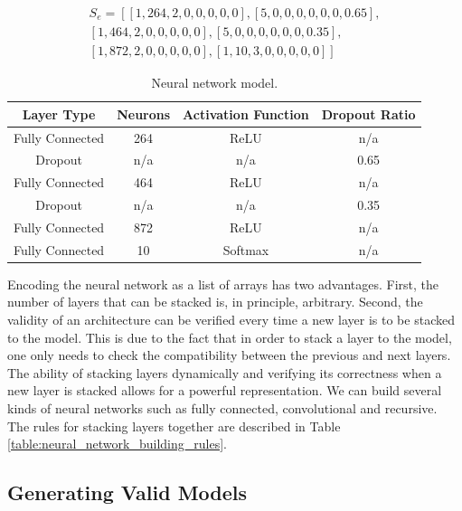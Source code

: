 \documentclass[12pt]{elsart}%
\begin{document}
\begin{align*}
S_e = \left[ \left[1, 264, 2, 0, 0, 0, 0, 0 \right], \left[5, 0, 0, 0, 0, 0, 0, 0.65 \right], \right. \\
\left. \left[1, 464, 2, 0, 0, 0, 0, 0 \right], \left[5, 0, 0, 0, 0, 0, 0, 0.35 \right], \right. \\
\left. \left[1, 872, 2, 0, 0, 0, 0, 0 \right], \left[1, 10, 3, 0, 0, 0, 0, 0 \right] \right]
\end{align*}

\begin{table}[!htb]
\begin{center}
\caption{Neural network model.}
\label{table:neural_network_model}
\vspace{12pt}
\begin{tabular}{| c | c | c | c |}
\hline
Layer Type & Neurons & Activation Function & Dropout Ratio \\
\hline
Fully Connected & 264 & ReLU & n/a \\
Dropout & n/a & n/a & 0.65 \\
Fully Connected & 464 & ReLU & n/a\\
Dropout & n/a & n/a & 0.35\\
Fully Connected & 872 & ReLU & n/a\\
Fully Connected & 10 & Softmax & n/a\\
\hline
\end{tabular}
\end{center}
\end{table}

Encoding the neural network as a list of arrays has two advantages. First, the number of layers that can be stacked is, in principle, arbitrary. Second, the validity of an architecture can be verified every time a new layer is to be stacked to the model. This is due to the fact that in order to stack a layer to the model, one only needs to check the compatibility between the previous and next layers. The ability of stacking layers dynamically and verifying its correctness when a new layer is stacked allows for a powerful representation. We can build several kinds of neural networks such as fully connected, convolutional and recursive. The rules for stacking layers together are described in Table \ref{table:neural_network_building_rules}.

\subsection{Generating Valid Models}
\label{sec:valid_models}
\end{document}
